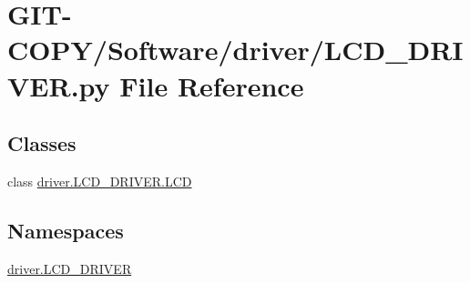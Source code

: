 \hypertarget{GIT-COPY_2Software_2driver_2LCD__DRIVER_8py}{}\section{G\+I\+T-\/\+C\+O\+P\+Y/\+Software/driver/\+L\+C\+D\+\_\+\+D\+R\+I\+V\+E\+R.py File Reference}
\label{GIT-COPY_2Software_2driver_2LCD__DRIVER_8py}
\subsection*{Classes}
\begin{DoxyCompactItemize}
\item 
class \hyperlink{classdriver_1_1LCD__DRIVER_1_1LCD}{driver.\+L\+C\+D\+\_\+\+D\+R\+I\+V\+E\+R.\+L\+C\+D}
\end{DoxyCompactItemize}
\subsection*{Namespaces}
\begin{DoxyCompactItemize}
\item 
 \hyperlink{namespacedriver_1_1LCD__DRIVER}{driver.\+L\+C\+D\+\_\+\+D\+R\+I\+V\+E\+R}
\end{DoxyCompactItemize}
